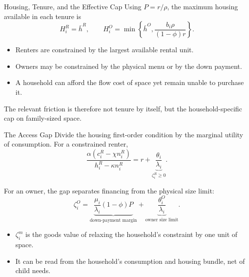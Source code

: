 \documentclass[aspectratio=169,11pt]{beamer}
\newcommand{\source}[1]{}
\newcommand{\tightitems}{\setlength{\itemsep}{0.55em}}
\newcommand{\1}{\mathbf 1}
\begin{document}
\begin{frame}{Housing, Tenure, and the Effective Cap}
  \large
  Using $P=r/\rho$, the maximum housing available in each tenure is
  \[
    H_i^R=\bar h^R,
    \qquad
    H_i^O=\min\left\{\bar h^O,\frac{b_i\rho}{(1-\phi)r}\right\}.
  \]

  \begin{itemize}\tightitems
    \item Renters are constrained by the largest available rental unit.
    \item Owners may be constrained by the physical menu or by the down payment.
    \item A household can afford the flow cost of space yet remain unable to purchase it.
  \end{itemize}

  \vspace{0.5em}
  The relevant friction is therefore not tenure by itself, but the household-specific cap on family-sized space.
  \source{Circulated note, Analytical Model: Households and equilibrium policies.}
\end{frame}

\begin{frame}{The Access Gap}
  Divide the housing first-order condition by the marginal utility of consumption. For a constrained renter,
  \[
    \frac{\alpha(c_i^R-\chi n_i^R)}{h_i^R-\kappa n_i^R}
      = r+\underbrace{\frac{\theta_i}{\lambda_i}}_{\zeta_i^R\ge0}.
  \]

  For an owner, the gap separates financing from the physical size limit:
  \[
    \zeta_i^O
    =\underbrace{\frac{\mu_i}{\lambda_i}(1-\phi)P}_{\text{down-payment margin}}
    +\underbrace{\frac{\theta_i^O}{\lambda_i}}_{\text{owner size limit}}.
  \]

  \begin{itemize}\tightitems
    \item $\zeta_i^m$ is the goods value of relaxing the household's constraint by one unit of space.
    \item It can be read from the household's consumption and housing bundle, net of child needs.
  \end{itemize}
  \source{Circulated note, Analytical Model: Equilibrium policies.}
\end{frame}
\end{document}
